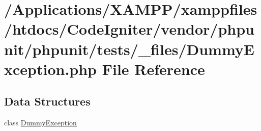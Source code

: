 \hypertarget{_dummy_exception_8php}{}\section{/\+Applications/\+X\+A\+M\+P\+P/xamppfiles/htdocs/\+Code\+Igniter/vendor/phpunit/phpunit/tests/\+\_\+files/\+Dummy\+Exception.php File Reference}
\label{_dummy_exception_8php}
\subsection*{Data Structures}
\begin{DoxyCompactItemize}
\item 
class \mbox{\hyperlink{class_dummy_exception}{Dummy\+Exception}}
\end{DoxyCompactItemize}
